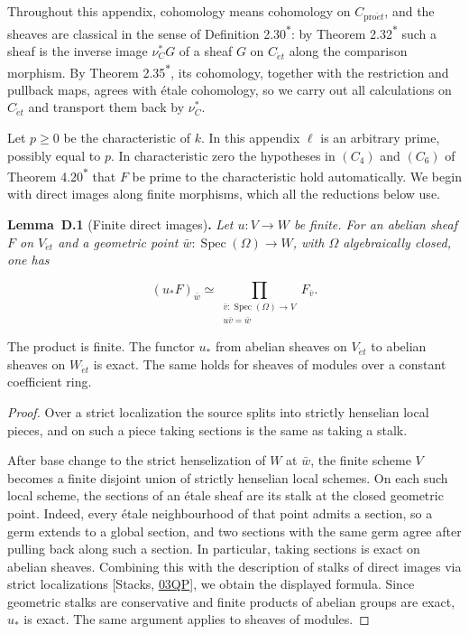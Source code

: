 \documentclass[11pt]{article}
\newenvironment{bpstatement}[2]{\par\addvspace{0.6\baselineskip}\noindent\textbf{#1}#2\textbf{.}\enspace\ignorespaces}
  {\par\addvspace{0.4\baselineskip}}
\newenvironment{bpstatementit}[2]{\begin{bpstatement}{#1}{#2}\itshape\ignorespaces}{\end{bpstatement}}
\newcommand{\bpout}[1]{#1\textsuperscript{\hyperlink{bp-outside}{\ensuremath{\ast}}}}
\begin{document}
Throughout this appendix, cohomology means cohomology on \(C_{\mathrm{pro}\acute{e}t}\), and the sheaves are classical in the sense of Definition \bpout{2.30}: by Theorem \bpout{2.32} such a sheaf is the inverse image \(\nu_C^*G\) of a sheaf \(G\) on \(C_{\acute{e}t}\) along the comparison morphism. By Theorem \bpout{2.35}, its cohomology, together with the restriction and pullback maps, agrees with étale cohomology, so we carry out all calculations on \(C_{\acute{e}t}\) and transport them back by \(\nu_C^*\).

Let \(p\ge0\) be the characteristic of \(k\). In this appendix \(\ell\) is an arbitrary prime, possibly equal to \(p\). In characteristic zero the hypotheses in \((C_4)\) and \((C_6)\) of Theorem \bpout{4.20} that \(F\) be prime to the characteristic hold automatically. We begin with direct images along finite morphisms, which all the reductions below use.

\label{bp174}%
\begin{bpstatementit}{Lemma~D.1}{ (Finite direct images)}
Let \(u:V\to W\) be finite. For an abelian sheaf \(F\) on \(V_{\acute{e}t}\) and a geometric point \(\bar w:\operatorname{Spec}(\Omega)\to W\), with \(\Omega\) algebraically closed, one has

\[
(u_*F)_{\bar w}
\simeq \prod_{\substack{\bar v:\operatorname{Spec}(\Omega)\to V\\
u\bar v=\bar w}}F_{\bar v}.
\]

The product is finite. The functor \(u_*\) from abelian sheaves on \(V_{\acute{e}t}\) to abelian sheaves on \(W_{\acute{e}t}\) is exact. The same holds for sheaves of modules over a constant coefficient ring.
\end{bpstatementit}

\begin{proof}[{Proof}]\label{bp175}%
Over a strict localization the source splits into strictly henselian local pieces, and on such a piece taking sections is the same as taking a stalk.

After base change to the strict henselization of \(W\) at \(\bar w\), the finite scheme \(V\) becomes a finite disjoint union of strictly henselian local schemes. On each such local scheme, the sections of an étale sheaf are its stalk at the closed geometric point. Indeed, every étale neighbourhood of that point admits a section, so a germ extends to a global section, and two sections with the same germ agree after pulling back along such a section. In particular, taking sections is exact on abelian sheaves. Combining this with the description of stalks of direct images via strict localizations [Stacks, \href{https://stacks.math.columbia.edu/tag/03QP}{03QP}], we obtain the displayed formula. Since geometric stalks are conservative and finite products of abelian groups are exact, \(u_*\) is exact. The same argument applies to sheaves of modules.
\end{proof}
\end{document}

